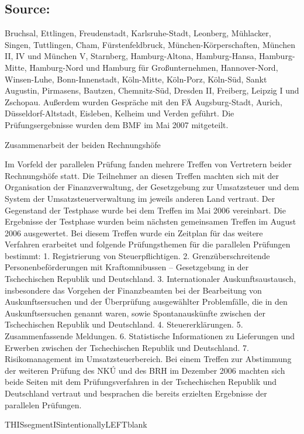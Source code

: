 \documentclass[10pt]{article}
\begin{document}
\subsection*{Source:}

Bruchsal, Ettlingen, Freudenstadt, Karlsruhe-Stadt, Leonberg, Mühlacker, Singen, Tuttlingen, Cham, Fürstenfeldbruck, München-Körperschaften, München II, IV und München V, Starnberg, Hamburg-Altona, Hamburg-Hansa, Hamburg-Mitte, Hamburg-Nord und Hamburg für Großunternehmen, Hannover-Nord, Winsen-Luhe, Bonn-Innenstadt, Köln-Mitte, Köln-Porz, Köln-Süd, Sankt Augustin, Pirmasens, Bautzen, Chemnitz-Süd, Dresden II, Freiberg, Leipzig I und Zschopau.
Außerdem wurden Gespräche mit den FÄ Augsburg-Stadt, Aurich, Düsseldorf-Altstadt, Eisleben, Kelheim und Verden geführt.
Die Prüfungsergebnisse wurden dem BMF im Mai 2007 mitgeteilt.


Zusammenarbeit der beiden Rechnungshöfe

Im Vorfeld der parallelen Prüfung fanden mehrere Treffen von Vertretern beider Rechnungshöfe statt.
Die Teilnehmer an diesen Treffen machten sich mit der Organisation der Finanzverwaltung, der Gesetzgebung zur Umsatzsteuer und dem System der Umsatzsteuerverwaltung im jeweils anderen Land vertraut.
Der Gegenstand der Testphase wurde bei dem Treffen im Mai 2006 vereinbart.
Die Ergebnisse der Testphase wurden beim nächsten gemeinsamen Treffen im August 2006 ausgewertet.
Bei diesem Treffen wurde ein Zeitplan für das weitere Verfahren erarbeitet und folgende Prüfungsthemen für die parallelen Prüfungen bestimmt: 1.
Registrierung von Steuerpﬂichtigen.
2.
Grenzüberschreitende Personenbeförderungen mit Kraftomnibussen – Gesetzgebung in der Tschechischen Republik und Deutschland.
3. Internationaler Auskunftsaustausch, insbesondere das Vorgehen der Finanzbeamten bei der Bearbeitung von Auskunftsersuchen und der Überprüfung ausgewählter Problemfälle, die in den Auskunftsersuchen genannt waren, sowie Spontanauskünfte zwischen der Tschechischen Republik und Deutschland.
4. Steuererklärungen.
5.
Zusammenfassende Meldungen.
6.
Statistische Informationen zu Lieferungen und Erwerben zwischen der Tschechischen Republik und Deutschland.
7. Risikomanagement im Umsatzsteuerbereich.
Bei einem Treffen zur Abstimmung der weiteren Prüfung des NKÚ und des BRH im Dezember 2006 machten sich beide Seiten mit dem Prüfungsverfahren in der Tschechischen Republik und Deutschland vertraut und besprachen die bereits erzielten Ergebnisse der parallelen Prüfungen.


THISsegmentISintentionallyLEFTblank
\end{document}
